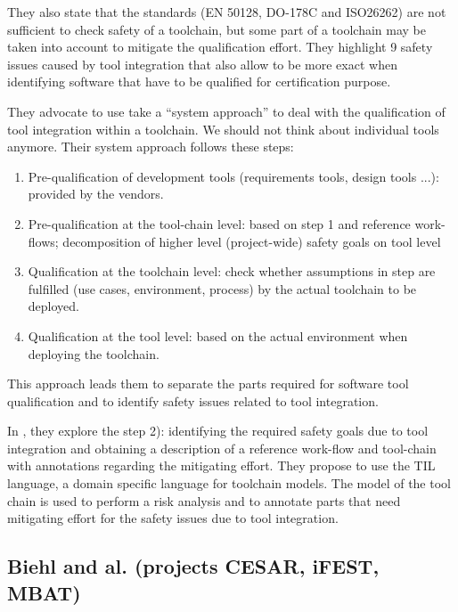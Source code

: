 They also state that the standards (EN 50128, DO-178C and ISO26262)
are not sufficient to check safety of a toolchain, but some part of a
toolchain may be taken into account to mitigate the qualification
effort. 
They highlight 9 safety issues caused by tool integration that also
allow to be more exact when identifying software that have to be
qualified for certification purpose. 

They advocate to use take a ``system approach''  to deal with the qualification of tool integration within a toolchain. We should not
think about individual tools anymore.  Their system approach follows these steps:

\begin{enumerate}
\item Pre-qualification of development tools (requirements tools, design
  tools ...): provided by the vendors.
\item Pre-qualification at the tool-chain level: based on step 1 and
  reference work-flows; decomposition of higher level (project-wide) safety goals on tool level
\item Qualification at the toolchain level: check whether assumptions in step are fulfilled (use cases, environment, process) by the actual toolchain to be deployed.
\item Qualification at the tool level: based on the actual environment
  when deploying the toolchain.
\end{enumerate}
This approach leads them to separate the parts required for software tool
qualification and to identify safety issues related to tool integration.

In \cite{asplund_towards_2012}, they explore the step 2): identifying
the required safety goals due to tool integration and obtaining a
description of a reference work-flow and tool-chain with annotations regarding the mitigating effort.  They propose to use the TIL language, a
domain specific language for toolchain models.  The model of the tool
chain is used to perform a risk analysis and to annotate parts
that need mitigating effort for the safety issues due to tool
integration. 

\subsection{Biehl and al. (projects CESAR, iFEST, MBAT)}
\label{sec:biehl-approach}

